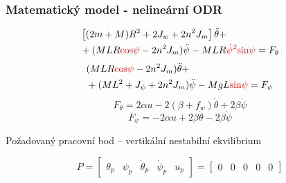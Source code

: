 \documentclass{beamer}
\begin{document}
    \begin{frame}
    

        
        \frametitle{Matematický model - nelineární ODR}    
        \begin{equation}
            \begin{aligned}
                &\left[(2m + M) R^2 + 2 J_w + 2n^2 J_m\right] \ddot{\theta} + \\
                &+ (MLR \textcolor{red}{\text{cos}\psi} - 2n^2 J_m) \ddot{\psi} - MLR\textcolor{red}{\dot{\psi}^2 \text{sin} \psi} = F_\theta
            \end{aligned}
            \label{eq:pohyb1}
        \end{equation}
        \begin{equation}
            \begin{aligned}
                & (MLR \textcolor{red}{\text{cos} \psi} - 2n^2 J_m) \ddot{\theta} + \\ &+ (ML^2 + J_\psi + 2n^2 J_m) \ddot{\psi}
                - MgL\textcolor{red}{\text{sin}\psi} = F_\psi
            \end{aligned}
            \label{eq:pohyb2}
        \end{equation}
        \begin{equation}
            F_\theta = 2 \alpha u- 2(\beta + f_w) \dot{\theta} + 2\beta\dot{\psi}
            \label{eq:motor1_easy}
        \end{equation}
        \begin{equation}
            F_\psi = - 2 \alpha u + 2\beta \dot{\theta} - 2\beta \dot{\psi}
            \label{eq:motor2_easy}
        \end{equation}

        Požadovaný pracovní bod -- vertikální nestabilní ekvilibrium

        \begin{equation}
            P = \begin{bmatrix}
                \theta_p &    \psi_p &     \dot{\theta}_p &     \dot{\psi}_p & u_p
            \end{bmatrix} = \begin{bmatrix}
                0 & 0 & 0 & 0 & 0
            \end{bmatrix}
            \label{eq:prac_bod}
        \end{equation}
        
    \end{frame}
    
\end{document}
